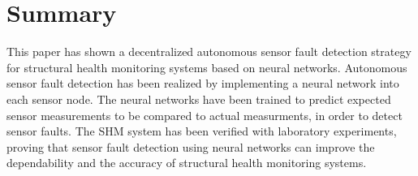 \documentclass[12pt,a4paper]{scrartcl}
\begin{document}

\section*{Summary}

This paper has shown a decentralized autonomous sensor fault detection strategy for structural health monitoring systems based on neural networks. 
Autonomous sensor fault detection has been realized by implementing a neural network into each sensor node.
The neural networks have been trained to predict expected sensor measurements to be compared to actual measurments, in order to detect sensor faults.
The SHM system has been verified with laboratory experiments, proving that sensor fault detection using neural networks can improve the dependability and the accuracy of structural health monitoring systems.




\end{document}
